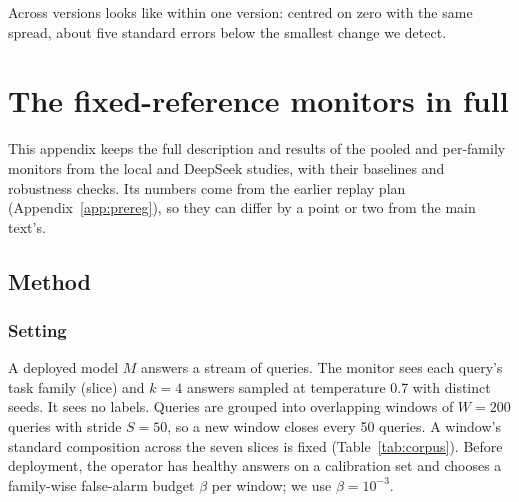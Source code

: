 \documentclass{article}
\begin{document}
\begin{center}\small
{}
\end{center}

\noindent Across versions looks like within one version: centred on zero with the
same spread, about five standard errors below the smallest change we detect.

\section{The fixed-reference monitors in full}
\label{app:fixed}

This appendix keeps the full description and results of the pooled and per-family
monitors from the local and DeepSeek studies, with their baselines and robustness
checks. Its numbers come from the earlier replay plan (Appendix~\ref{app:prereg}),
so they can differ by a point or two from the main text's.

\subsection{Method}
\label{app:fixed-method}

\subsubsection{Setting}
A deployed model $M$ answers a stream of queries. The monitor sees each query's
task family (slice) and $k=4$ answers sampled at temperature 0.7 with distinct
seeds. It sees no labels. Queries are grouped into overlapping windows of $W=200$
queries with stride $S=50$, so a new window closes every 50 queries. A window's
standard composition across the seven slices is fixed
(Table~\ref{tab:corpus}). Before deployment, the operator has healthy answers on a
calibration set and chooses a family-wise false-alarm budget $\beta$ per window;
we use $\beta=10^{-3}$.
\end{document}
